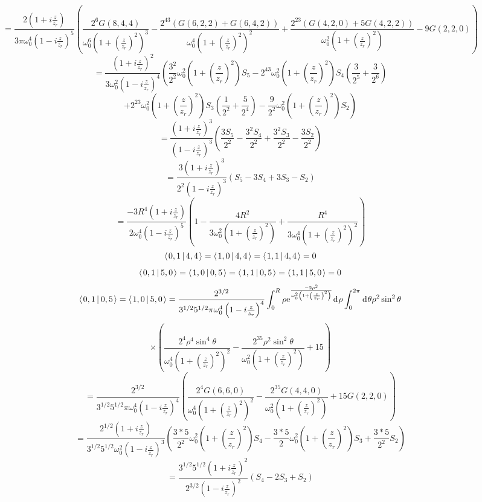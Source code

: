 \documentclass[11pt]{amsart}
\makeatletter
\newcommand{\e}{{\rm e}}				%
\newcommand{\msp}[1]{\mspace{#1mu}}		%
\newcommand{\0}{\varnothing}		%
\newcommand{\dd}{\msp{1} {\rm{d}} \msp{1}}	%
\newcommand{\brac}[2]{\left\langle\msp{2} #1\left\lvert \msp{3.5} #2 \right.\right\rangle}	%
\newcommand{\1}{!}
\newcommand{\2}{@}
\newcommand{\3}{\#}
\newcommand{\4}{\$}
\newcommand{\5}{\%}
\newcommand{\6}{$^\wedge$}
\newcommand{\7}{\&}
\newcommand{\8}{*}
\newcommand{\9}{(}
\makeatother
\begin{document}
\[
=\frac{2\left(1+i\frac{z}{z_r}\right)}{3\pi\omega_0^4\left(1-i\frac{z}{z_r}\right)^5}\left(\frac{2^6G(8,4,4)}{\omega_0^6\left(1+\left(\frac{z}{z_r}\right)^2\right)^3}-\frac{2^43\left(G(6,2,2)+G(6,4,2)\right)}{\omega_0^4\left(1+\left(\frac{z}{z_r}\right)^2\right)^2}+\frac{2^23\left(G(4,2,0)+5G(4,2,2)\right)}{\omega_0^2\left(1+\left(\frac{z}{z_r}\right)^2\right)}-9G(2,2,0)\right)
\]
\[
=\frac{\left(1+i\frac{z}{z_r}\right)^2}{3\omega_0^2\left(1-i\frac{z}{z_r}\right)^4}\left(\frac{3^2}{2^2}\omega_0^2\left(1+\left(\frac{z}{z_r}\right)^2\right)S_5-2^43\omega_0^2\left(1+\left(\frac{z}{z_r}\right)^2\right)S_4\left(\frac{3}{2^5}+\frac{3}{2^6}\right)
\right.
\]
\[
\left.+2^23\omega_0^2\left(1+\left(\frac{z}{z_r}\right)^2\right)S_3\left(\frac{1}{2^2}+\frac{5}{2^4}\right)-\frac{9}{2^2}\omega_0^2\left(1+\left(\frac{z}{z_r}\right)^2\right)S_2\right)
\]
\[
=\frac{\left(1+i\frac{z}{z_r}\right)^3}{\left(1-i\frac{z}{z_r}\right)^3}\left(\frac{3S_5}{2^2}-\frac{3^2S_4}{2^2}+\frac{3^2S_3}{2^2}-\frac{3S_2}{2^2}\right)
\]
\[
=\frac{3\left(1+i\frac{z}{z_r}\right)^3}{2^2\left(1-i\frac{z}{z_r}\right)^3}\left(S_5-3S_4+3S_3-S_2\right)
\]
\[
=\frac{-3R^4\left(1+i\frac{z}{z_r}\right)}{2\omega_0^4\left(1-i\frac{z}{z_r}\right)^5}\left(1-\frac{4R^2}{3\omega_0^2\left(1+\left(\frac{z}{z_r}\right)^2\right)}+\frac{R^4}{3\omega_0^4\left(1+\left(\frac{z}{z_r}\right)^2\right)^2}\right)
\]
\[
\brac{0,1}{4,4} =\brac{1,0}{4,4} = \brac{1,1}{4,4} = 0
\]
\[
\brac{0,1}{5,0} = \brac{1,0}{0,5} = \brac{1,1}{0,5} = \brac{1,1}{5,0} = 0
\]
\[
\brac{0,1}{0,5} = \brac{1,0}{5,0} = \frac{2^{3/2}}{3^{1/2}5^{1/2}\pi\omega_0^4\left(1-i\frac{z}{z_r}\right)^4}\int_0^R\rho \e^{\frac{-2\rho^2}{\omega_0^2\left(1+\left(\frac{z}{z_r}\right)^2\right)}}\dd \rho\int_0^{2\pi}\dd \theta \rho^2\sin^2\theta
\]
\[
\times\left(\frac{2^4\rho^4\sin^4\theta}{\omega_0^4\left(1+\left(\frac{z}{z_r}\right)^2\right)^2}-\frac{2^35\rho^2\sin^2\theta}{\omega_0^2\left(1+\left(\frac{z}{z_r}\right)^2\right)}+15\right)
\]
\[
=\frac{2^{3/2}}{3^{1/2}5^{1/2}\pi\omega_0^4\left(1-i\frac{z}{z_r}\right)^4}\left(\frac{2^4G(6,6,0)}{\omega_0^4\left(1+\left(\frac{z}{z_r}\right)^2\right)^2}-\frac{2^35G(4,4,0)}{\omega_0^2\left(1+\left(\frac{z}{z_r}\right)^2\right)}+15G(2,2,0)\right)
\]
\[
=\frac{2^{1/2}\left(1+i\frac{z}{z_r}\right)}{3^{1/2}5^{1/2} \omega_0^2\left(1-i\frac{z}{z_r}\right)^3}\left(\frac{3*5}{2^2}\omega_0^2\left(1+\left(\frac{z}{z_r}\right)^2\right)S_4-\frac{3*5}{2}\omega_0^2\left(1+\left(\frac{z}{z_r}\right)^2\right)S_3+\frac{3*5}{2^2}S_2\right)
\]
\[
=\frac{3^{1/2}5^{1/2}\left(1+i\frac{z}{z_r}\right)^2}{2^{3/2}\left(1-i\frac{z}{z_r}\right)^2}\left(S_4-2S_3+S_2\right)
\]
\end{document}
